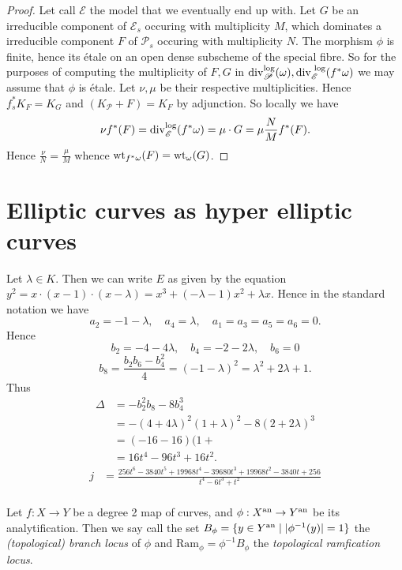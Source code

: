 \begin{proof}
	Let call $\mathscr E$ the model that we eventually end up with. 
	Let $G$ be an irreducible component of $\mathscr E_s $ occuring with multiplicity $M$, which dominates a irreducible component $F$ of $\mathscr P_s$ occuring with multiplicity $N$. 
	The morphism $\phi$ is finite, hence its étale on an open dense subscheme of the special fibre.
	So for the purposes of computing the multiplicity of $F, G$ in $\operatorname{div}_\mathscr P ^{\text{log}}(\omega), \operatorname{div} _{\mathscr E}^{\text{ log}}(f^*\omega)$ we may assume that $\phi$ is étale. Let $\nu, \mu$ be their respective multiplicities. 
	Hence $f^*_s K_F = K_G$ and $(K_{\mathscr P} + F) = K_F$ by adjunction.
	So locally we have \[
		\nu f^*(F) = \operatorname{div}_{\mathscr E} ^{\text{log}} (f^*\omega) = \mu\cdot G  = \mu \frac{N}{M} f^* (F)  
	.\]
	Hence $\frac{\nu}{ N} = \frac{\mu}{M}$ whence $\operatorname{wt}_{f^*\omega}(F) = \operatorname{wt}_\omega(G)$. 
\end{proof}

\section{Elliptic curves as hyper elliptic curves} \label{sec:elliptic_curves_as_hyper_elliptic_curves}

Let $\lambda \in K$. Then we can write $E$ as given by the equation $y^2 = x\cdot (x-1)\cdot (x-\lambda) = x^3 + (-\lambda - 1) x^2 + \lambda x$. 
Hence in the standard notation we have  \[
a_2= -1-\lambda, \quad a_4 = \lambda, \quad a_1 = a_3 = a_5 = a_6 = 0
.\] 
Hence \[
b_2 = -4 -4\lambda, \quad b_4 = -2-2\lambda, \quad b_6 = 0\]
\[
	b_8 =\frac{b_2 b_6 - b_4^2}{4} =  (-1-\lambda)^2 = \lambda^2 + 2\lambda + 1
.\] 
Thus 
\begin{align*}
	\Delta &= -b_2^2 b_8 - 8b_4^3 \\
	       &= -(4+ 4\lambda)^2(1+\lambda)^2 - 8 (2 + 2\lambda)^3 \\
	       &= (-16 -16)(1+  \\
	       &= 16t^4 - 96t^3 + 16t^2
.\end{align*} 
\begin{align*}
	j &=  \frac{256t^6 - 3840t^5 + 19968t^4 - 39680t^3 + 19968t^2 - 3840t + 256}{t^4 - 6t^3 + t^2} \\
\end{align*}

\begin{definition}
	Let $f: X \to Y$ be a degree 2 map of curves, and  $\phi: X{}^{\text{an}} \to Y{}^{\text{an}}$ be its analytification.
	Then we say call the set  $B_\phi = \{y \in Y{}^{\text{an}}  \mid |\phi^{-1}(y)| = 1\} $ the \emph{(topological) branch locus} of $\phi$ and $\mathrm{Ram}_\phi = \phi^{-1} B_\phi$ the \emph{topological ramfication locus}. 
\end{definition}


